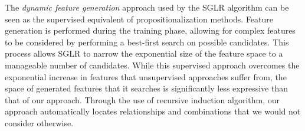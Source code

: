 \documentclass{article}
\theoremstyle{definition}
\begin{document}


The \emph{dynamic feature generation} approach used by the SGLR algorithm \citep{popescul200716} can be seen as the supervised equivalent of propositionalization methods. Feature generation is performed during the training phase, allowing for complex features to be considered by performing a best-first search on possible candidates.
This process allows SGLR to narrow the exponential size of the feature space to a manageable number of candidates.
While this supervised approach overcomes the exponential increase in features that unsupervised approaches suffer from, the space of generated features that it searches is significantly less expressive than that of our approach.
Through the use of recursive induction algorithm, our approach automatically locates relationships and combinations that we would not consider otherwise.
\end{document}
